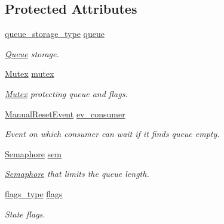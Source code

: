 \subsection*{Protected Attributes}
\begin{DoxyCompactItemize}
\item 
\hyperlink{classlog4cplus_1_1thread_1_1Queue_af9d2a870aac3a6cbf38e702bcc163741}{queue\-\_\-storage\-\_\-type} \hyperlink{classlog4cplus_1_1thread_1_1Queue_a553238e42f50ceb87ce0e5baad6188c6}{queue}
\begin{DoxyCompactList}\small\item\em \hyperlink{classlog4cplus_1_1thread_1_1Queue}{Queue} storage. \end{DoxyCompactList}\item 
\hyperlink{classlog4cplus_1_1thread_1_1Mutex}{Mutex} \hyperlink{classlog4cplus_1_1thread_1_1Queue_affc762dbd7de3adb3757b4d82befccd0}{mutex}
\begin{DoxyCompactList}\small\item\em \hyperlink{classlog4cplus_1_1thread_1_1Mutex}{Mutex} protecting queue and flags. \end{DoxyCompactList}\item 
\hyperlink{classlog4cplus_1_1thread_1_1ManualResetEvent}{Manual\-Reset\-Event} \hyperlink{classlog4cplus_1_1thread_1_1Queue_aefde3dd0dfe83607b625939494e02522}{ev\-\_\-consumer}
\begin{DoxyCompactList}\small\item\em Event on which consumer can wait if it finds queue empty. \end{DoxyCompactList}\item 
\hyperlink{classlog4cplus_1_1thread_1_1Semaphore}{Semaphore} \hyperlink{classlog4cplus_1_1thread_1_1Queue_a0f464e634217be6effe4151f9057aec6}{sem}
\begin{DoxyCompactList}\small\item\em \hyperlink{classlog4cplus_1_1thread_1_1Semaphore}{Semaphore} that limits the queue length. \end{DoxyCompactList}\item 
\hyperlink{classlog4cplus_1_1thread_1_1Queue_a6abff6eb8b4963c0ecf3e1ed67622490}{flags\-\_\-type} \hyperlink{classlog4cplus_1_1thread_1_1Queue_aec6bebc2a4b3d0f44598b0cfb1aa6777}{flags}
\begin{DoxyCompactList}\small\item\em State flags. \end{DoxyCompactList}\end{DoxyCompactItemize}

